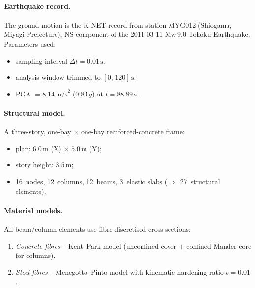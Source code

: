 \paragraph{Earthquake record.}
The ground motion is the K-NET record from station MYG012 (Shiogama,
Miyagi Prefecture), NS component of the 2011-03-11 Mw\,9.0 Tohoku
Earthquake.  Parameters used:
\begin{itemize}
  \item sampling interval $\Delta t = 0.01\,\text{s}$;
  \item analysis window trimmed to $[0,\,120]\,\text{s}$;
  \item PGA $= 8.14\,\text{m/s}^2$ ($0.83\,g$) at $t = 88.89\,\text{s}$.
\end{itemize}

\paragraph{Structural model.}
A three-story, one-bay $\times$ one-bay reinforced-concrete frame:
\begin{itemize}
  \item plan: $6.0\,\text{m}$ (X) $\times$ $5.0\,\text{m}$ (Y);
  \item story height: $3.5\,\text{m}$;
  \item 16~nodes, 12~columns, 12~beams, 3~elastic slabs
        ($\Rightarrow$ 27~structural elements).
\end{itemize}

\paragraph{Material models.}
All beam/column elements use fibre-discretised cross-sections:
\begin{enumerate}
  \item \emph{Concrete fibres} -- Kent--Park model (unconfined cover +
        confined Mander core for columns).
  \item \emph{Steel fibres} -- Menegotto--Pinto model with kinematic
        hardening ratio $b = 0.01$.
\end{enumerate}

